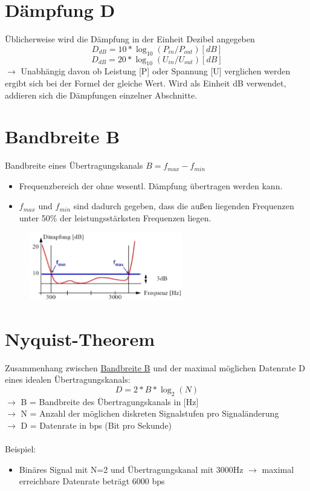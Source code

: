 \documentclass{scrreprt}
\begin{document}
\section{Dämpfung D}
\label{sec:dampf}
Üblicherweise wird die Dämpfung in der Einheit Dezibel angegeben
$$D_{dB}=10*\log_{10}(P_{in}/P_{out})  [dB]$$
$$D_{dB}=20*\log_{10}(U_{in}/U_{out})  [dB]$$
$\rightarrow$   Unabhängig davon ob Leistung [P] oder Spannung [U] verglichen werden
ergibt sich bei der Formel der gleiche Wert.
Wird als Einheit dB verwendet, addieren sich die Dämpfungen einzelner Abschnitte.

\section{Bandbreite B}
\label{sec:bandbreite}
Bandbreite eines Übertragungskanals $B = f_{max}-f_{min}$
\begin{itemize}
	\item Frequenzbereich der ohne wesentl. Dämpfung übertragen werden kann.
	\item $f_{max}$ und $f_{min}$ sind dadurch gegeben, dass die außen liegenden Frequenzen
	      unter 50\% der leistungsstärksten Frequenzen liegen.
\end{itemize}
\begin{figure}[h]
	\includegraphics[width=0.60\textwidth]{"graphics/Dampfung"}
	\centering
\end{figure}

\section{Nyquist-Theorem}
Zusammenhang zwischen \hyperref[sec:bandbreite]{Bandbreite B} und der maximal möglichen
Datenrate D eines idealen Übertragungskanals:
$$D = 2*B*\log_{2}(N)$$
$\rightarrow$ B = Bandbreite des Übertragungskanals in [Hz]
\\
$\rightarrow$ N = Anzahl der möglichen diskreten Signalstufen pro Signaländerung
\\
$\rightarrow$ D = Datenrate in bps (Bit pro Sekunde)
\\\\
Beispiel:
\begin{itemize}
	\item Binäres Signal mit N=2 und Übertragungskanal mit 3000Hz
	      $\rightarrow$ maximal erreichbare Datenrate beträgt 6000 bps
\end{itemize}
\end{document}
